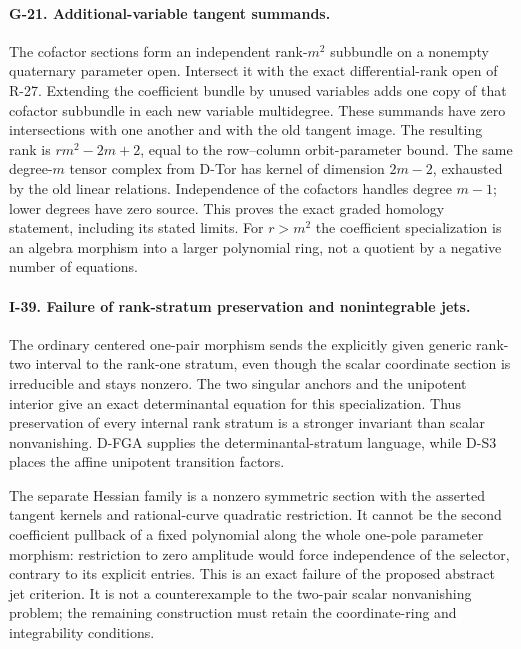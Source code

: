 \paragraph{G-21. Additional-variable tangent summands.}
The cofactor sections form an independent rank-$m^2$
subbundle on a nonempty quaternary parameter open. Intersect
it with the exact differential-rank open of R-27. Extending
the coefficient bundle by unused variables adds one copy
of that cofactor subbundle in each new variable multidegree.
These summands have zero intersections with one another
and with the old tangent image. The resulting rank is
$rm^2-2m+2$, equal to the row--column orbit-parameter bound.
The same degree-$m$ tensor complex from D-Tor has kernel
of dimension $2m-2$, exhausted by the old linear relations.
Independence of the cofactors handles degree $m-1$; lower
degrees have zero source. This proves the exact graded
homology statement, including its stated limits. For $r>m^2$
the coefficient specialization is an algebra morphism into
a larger polynomial ring, not a quotient by a negative
number of equations.

\paragraph{I-39. Failure of rank-stratum preservation and nonintegrable jets.}
The ordinary centered one-pair morphism sends the explicitly
given generic rank-two interval to the rank-one stratum,
even though the scalar coordinate section is irreducible
and stays nonzero. The two singular anchors and the unipotent
interior give an exact determinantal equation for this
specialization. Thus preservation of every internal rank
stratum is a stronger invariant than scalar nonvanishing.
D-FGA supplies the determinantal-stratum language, while
D-S3 places the affine unipotent transition factors.

The separate Hessian family is a nonzero symmetric section
with the asserted tangent kernels and rational-curve
quadratic restriction. It cannot be the second coefficient
pullback of a fixed polynomial along the whole one-pole
parameter morphism: restriction to zero amplitude would
force independence of the selector, contrary to its explicit
entries. This is an exact failure of the proposed abstract
jet criterion. It is not a counterexample to the two-pair
scalar nonvanishing problem; the remaining construction
must retain the coordinate-ring and integrability conditions.



